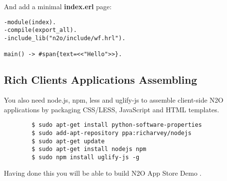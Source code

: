 And add a minimal {\bf index.erl} page:

\begin{lstlisting}[caption=index.erl]
-module(index).
-compile(export_all).
-include_lib("n2o/include/wf.hrl").

main() -> #span{text=<<"Hello">>}.
\end{lstlisting}

\subsection*{Rich Clients Applications Assembling}
You also need node.js, npm, less and uglify-js to assemble
client-side N2O applications by packaging CSS/LESS, JavaScript and HTML templates.

\vspace{1\baselineskip}
\begin{lstlisting}
        $ sudo apt-get install python-software-properties
        $ sudo add-apt-repository ppa:richarvey/nodejs
        $ sudo apt-get update
        $ sudo apt-get install nodejs npm
        $ sudo npm install uglify-js -g
\end{lstlisting}
\vspace{1\baselineskip}

Having done this you will be able to build N2O App Store
Demo \newline{}.